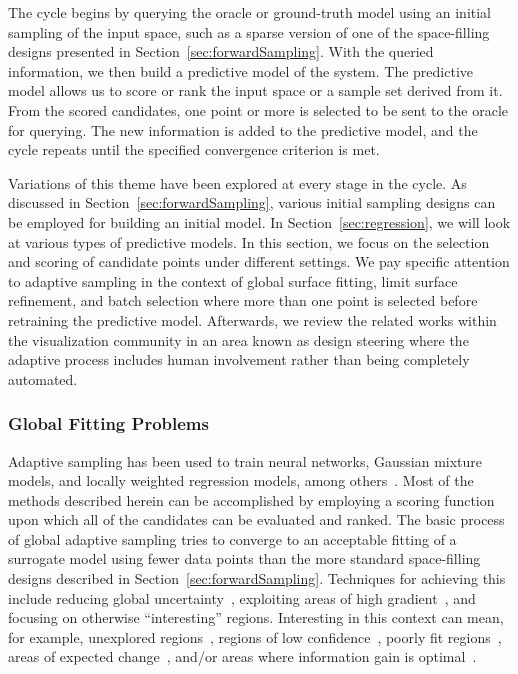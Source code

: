 The cycle begins by querying the oracle or ground-truth model using an initial sampling of the input space, such as a sparse version of one of the space-filling designs presented in Section~\ref{sec:forwardSampling}.
%
With the queried information, we then build a predictive model of the system.
%
%
The predictive model allows us to score or rank the input space or a sample set derived from it.
%
From the scored candidates, one point or more is selected to be sent to the oracle for querying.
%
The new information is added to the predictive model, and the cycle repeats until the specified convergence criterion is met.

Variations of this theme have been explored at every stage in the cycle.
%
As discussed in Section~\ref{sec:forwardSampling}, various initial sampling designs can be employed for building an initial model.
%
In Section~\ref{sec:regression}, we will look at various types of predictive models.
%
In this section, we focus on the selection and scoring of candidate points under different settings.
%
We pay specific attention to adaptive sampling in the context of global surface fitting, limit surface refinement, and batch selection where more than one point is selected before retraining the predictive model.
%
Afterwards, we review the related works within the visualization community in an area known as design steering where the adaptive process includes human involvement rather than being completely automated.

\subsubsection{Global Fitting Problems}

Adaptive sampling has been used to train neural networks, Gaussian mixture models, and locally weighted regression models, among others~\cite{CohnGhahramaniJordan1996}.
%
Most of the methods described herein can be accomplished by employing a scoring function upon which all of the candidates can be evaluated and ranked.
%
The basic process of global adaptive sampling tries to converge to an acceptable fitting of a surrogate model using fewer data points than the more standard space-filling designs described in Section~\ref{sec:forwardSampling}.
%
Techniques for achieving this include reducing global uncertainty~\cite{CohnGhahramaniJordan1996,TongKoller2001}, exploiting areas of high gradient~\cite{MaljovecWangKupresanin2013}, and focusing on otherwise ``interesting'' regions.
%
Interesting in this context can mean, for example, unexplored regions~\cite{Whitehead1991}, regions of low confidence~\cite{ThrunMoller1992}, poorly fit regions~\cite{LindenWeber1993}, areas of expected change~\cite{CohnAtlasLadner1990,CohnAtlasLadner1994}, and/or areas where information gain is optimal~\cite{Lam2008}.

